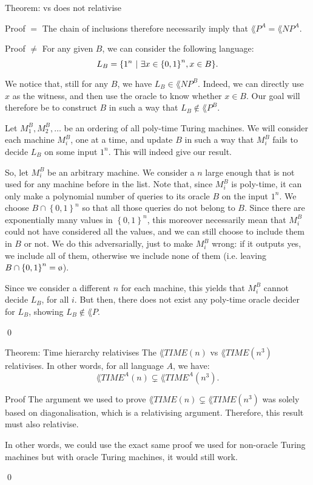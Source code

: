 \documentclass[a4paper]{article}
\begin{document}
\begin{parag}{Theorem:  vs  does not relativise}
\begin{subparag}{Proof $=$}
        The chain of inclusions therefore necessarily imply that $\lang{P}^A = \lang{NP}^A$.
    \end{subparag}

    \begin{subparag}{Proof $\neq$}
        For any given $B$, we can consider the following language: 
        \[L_B = \left\{1^n \suchthat \exists x \in \left\{0, 1\right\}^n, x \in B\right\}.\]

        We notice that, still for any $B$, we have $L_B \in \lang{NP}^B$. Indeed, we can directly use $x$ as the witness, and then use the oracle to know whether $x \in B$. Our goal will therefore be to construct $B$ in such a way that $L_B \not \in \lang{P}^B$.

        Let $M_1^B, M_2^B, \ldots$ be an ordering of all poly-time Turing machines. We will consider each machine $M_i^B$, one at a time, and update $B$ in such a way that $M_i^B$ fails to decide $L_B$ on some input $1^n$. This will indeed give our result. 

        So, let $M_i^B$ be an arbitrary machine. We consider a $n$ large enough that is not used for any machine before in the list. Note that, since $M_i^B$ is poly-time, it can only make a polynomial number of queries to its oracle $B$ on the input $1^n$. We choose $B \cap \left\{0, 1\right\}^n$ so that all those queries do not belong to $B$. Since there are exponentially many values in $\left\{0, 1\right\}^n$, this moreover necessarily mean that $M_i^B$ could not have considered all the values, and we can still choose to include them in $B$ or not. We do this adversarially, just to make $M_i^B$ wrong: if it outputs yes, we include all of them, otherwise we include none of them (i.e. leaving $B \cap \left\{0, 1\right\}^n = \o$).

        Since we consider a different $n$ for each machine, this yields that $M_i^B$ cannot decide $L_B$, for all $i$. But then, there does not exist any poly-time oracle decider for $L_B$, showing $L_B \not \in \lang{P}$.

        \qed
    \end{subparag}
\end{parag}

\begin{parag}{Theorem: Time hierarchy relativises}
    The $\lang{TIME}\left(n\right)$ vs $\lang{TIME}\left(n^3\right)$ relativises. In other words, for all language $A$, we have: 
    \[\lang{TIME}^A\left(n\right) \subsetneq \lang{TIME}^A\left(n^3\right).\]
    
    \begin{subparag}{Proof}
        The argument we used to prove $\lang{TIME}\left(n\right) \subsetneq \lang{TIME}\left(n^3\right)$ was solely based on diagonalisation, which is a relativising argument. Therefore, this result must also relativise.

        In other words, we could use the exact same proof we used for non-oracle Turing machines but with oracle Turing machines, it would still work.

        \qed
    \end{subparag}
\end{parag}
\end{document}
